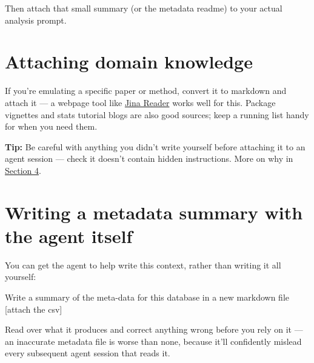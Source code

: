 \documentclass[
  letterpaper,
  DIV=11,
  numbers=noendperiod]{scrreprt}
\begin{document}
Then attach that small summary (or the metadata readme) to your actual
analysis prompt.

\section{Attaching domain knowledge}\label{attaching-domain-knowledge}

If you're emulating a specific paper or method, convert it to markdown
and attach it --- a webpage tool like
\href{https://tools.simonwillison.net/jina-reader}{Jina Reader} works
well for this. Package vignettes and stats tutorial blogs are also good
sources; keep a running list handy for when you need them.

\textbf{Tip:} Be careful with anything you didn't write yourself before
attaching it to an agent session --- check it doesn't contain hidden
instructions. More on why in
\href{../section-4-security-privacy/01-security-risk-examples.qmd}{Section
4}.

\section{Writing a metadata summary with the agent
itself}\label{writing-a-metadata-summary-with-the-agent-itself}

You can get the agent to help write this context, rather than writing it
all yourself:

\begin{tcolorbox}[enhanced jigsaw, bottomtitle=1mm, leftrule=.75mm, breakable, colbacktitle=quarto-callout-note-color!10!white, colframe=quarto-callout-note-color-frame, coltitle=black, toprule=.15mm, rightrule=.15mm, left=2mm, bottomrule=.15mm, title=\textcolor{quarto-callout-note-color}{\faInfo}\hspace{0.5em}{Prompt}, opacityback=0, arc=.35mm, toptitle=1mm, titlerule=0mm, opacitybacktitle=0.6, colback=white]

Write a summary of the meta-data for this database in a new markdown
file {[}attach the csv{]}

\end{tcolorbox}

Read over what it produces and correct anything wrong before you rely on
it --- an inaccurate metadata file is worse than none, because it'll
confidently mislead every subsequent agent session that reads it.
\end{document}
